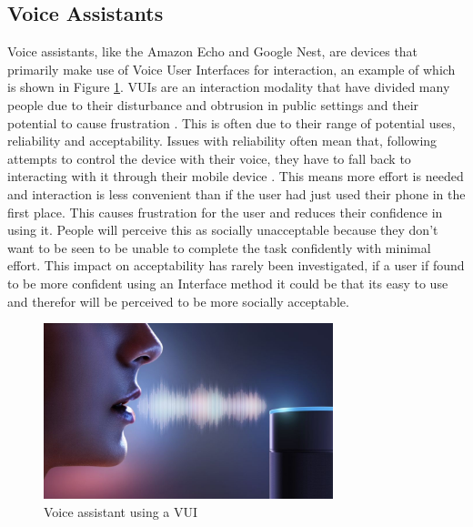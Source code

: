 \documentclass{l4proj}
\begin{document}
\subsection{Voice Assistants}


Voice assistants, like the Amazon Echo and Google Nest, are devices that primarily make use of Voice User Interfaces for interaction, an example of which is shown in Figure \ref{fig:VUI}. VUIs are an interaction modality that have divided many people due to their disturbance and obtrusion in public settings \citep{lee_interaction_2018} and their potential to cause frustration \citep{myers_patterns_2018}. This is often due to their range of potential uses, reliability and acceptability. Issues with reliability often mean that, following attempts to control the device with their voice, they have to fall back to interacting with it through their mobile device \citep{myers_patterns_2018}. This means more effort is needed and interaction is less convenient than if the user had just used their phone in the first place. This causes frustration for the user and reduces their confidence in using it. People will perceive this as socially unacceptable because they don't want to be seen to be unable to complete the task confidently with minimal effort. This impact on acceptability has rarely been investigated, if a user if found to be more confident using an Interface method it could be that its easy to use and therefor will be perceived to be more socially acceptable.

\begin{figure}[!htb]
    \centering
    \includegraphics[width=0.75\textwidth]{images/VUI.jpg}
        \caption{Voice assistant using a VUI}
        \label{fig:VUI}
\end{figure}
\end{document}
